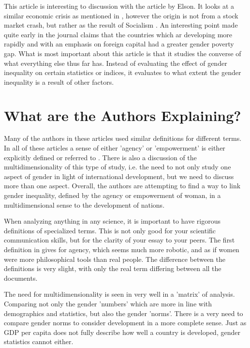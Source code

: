 \documentclass[12pt, letterpaper]{article}
\begin{document}
This article is interesting to discussion with the article by Elson. It looks at a similar economic crisis as mentioned in \cite{elson}, however the origin is not from a stock market crash, but rather as the result of Socialism \cite{foho}. An interesting point made quite early in the journal claims that the countries which ar developing more rapidly and with an emphasis on foreign capital had a greater gender poverty gap. What is most important about this article is that it studies the converse of what everything else thus far has. Instead of evaluating the effect of gender inequality on certain statistics or indices, it evaluates to what extent the gender inequality is a result of other factors. 
\section*{What are the Authors Explaining?}
Many of the authors in these articles used similar definitions for different terms. In all of these articles a sense of either 'agency' or 'empowerment' is either explicitly defined or referred to \cite{bhatt,ferrant}. There is also a discussion of the multidimensionality of this type of study, i.e. the need to not only study one aspect of gender in light of international development, but we need to discuss more than one aspect. Overall, the authors are attempting to find a way to link gender inequality, defined by the agency or empowerment of woman, in a multidimensional sense to the development of nations. 

When analyzing anything in any science, it is important to have rigorous definitions of specialized terms. This is not only good for your scientific communication skills, but for the clarity of your essay to your peers. The first definition in \cite{bhatt} gives for agency, which seems much more robotic, and as if women were more philosophical tools than real people. The difference between the definitions is very slight, with only the real term differing between all the documents. 

The need for multidimensionality is seen in \cite[202]{elson} very well in a 'matrix' of analysis. Comparing not only the gender 'numbers' which are more in line with demographics and statistics, but also the gender 'norms'. There is a very need to compare gender norms to consider development in a more complete sense. Just as GDP per capita does not fully describe how well a country is developed, gender statistics cannot either. 
\end{document}
